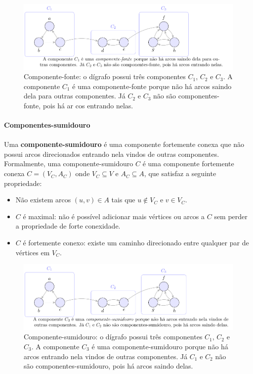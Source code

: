 \documentclass[12pt,a4paper]{article}
\begin{document}
\begin{figure}[H]
    \centering
    \includegraphics[width=0.9\linewidth]{figures/fig_componente_fonte.pdf}

    \caption{Componente-fonte: o dígrafo possui três componentes $C_1$, $C_2$ e $C_3$. A componente $C_1$ é uma componente-fonte porque não há arcos saindo dela para outras componentes. Já $C_2$ e $C_3$ não são componentes-fonte, pois há ar  cos entrando nelas.}
    \label{fig:componente-fonte}\end{figure}


\paragraph{Componentes-sumidouro}
\paragraph{}Uma \textbf{componente-sumidouro} é uma componente fortemente conexa que não possui arcos direcionados entrando nela vindos de outras componentes. Formalmente, uma componente-sumidouro \(C\) é uma componente fortemente conexa \(C = (V_C, A_C)\) onde \(V_C \subseteq V\) e \(A_C \subseteq A\), que satisfaz a seguinte propriedade:
\begin{itemize}
    \item Não existem arcos \((u, v) \in A\) tais que \(u \notin V_C\) e \(v \in V_C\).
    \item \(C\) é maximal: não é possível adicionar mais vértices ou arcos a \(C\) sem perder a propriedade de forte conexidade.
    \item \(C\) é fortemente conexo: existe um caminho direcionado entre qualquer par de vértices em \(V_C\).
\end{itemize}


\begin{figure}[H]
    \centering
    \includegraphics[width=0.9\linewidth]{figures/fig_componente_sumidouro.pdf}

    \caption{Componente-sumidouro: o dígrafo possui três componentes $C_1$, $C_2$ e $C_3$. A componente $C_3$ é uma componente-sumidouro porque não há arcos entrando nela vindos de outras componentes. Já $C_1$ e $C_2$ não são componentes-sumidouro, pois há arcos saindo delas.}
    \label{fig:componente-sumidouro}\end{figure}
\end{document}
